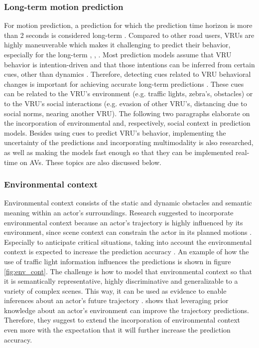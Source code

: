 \subsubsection{Long-term motion prediction}
For motion prediction, a prediction for which the prediction time horizon is more than 2 seconds is considered long-term \cite{hormann2020long}. Compared to other road users, \glspl{VRU} are highly maneuverable which makes it challenging to predict their behavior, especially for the long-term \cite{xiong2019recurrent}, \cite{rehder2018pedestrian}, \cite{rehder2018pedestrian}. Most prediction models assume that \gls{VRU} behavior is intention-driven and that those intentions can be inferred from certain cues, other than dynamics \cite{rehder2018pedestrian}. Therefore, detecting cues related to \gls{VRU} behavioral changes is important for achieving accurate long-term predictions \cite{pool2017using}. These cues can be related to the \gls{VRU}'s environment (e.g. traffic lights, zebra's, obstacles) or to the \gls{VRU}'s social interactions (e.g. evasion of other \gls{VRU}'s, distancing due to social norms, nearing another \gls{VRU}). The following two paragraphs elaborate on the incorporation of environmental and, respectively, social context in prediction models. Besides using cues to predict \gls{VRU}'s behavior, implementing the uncertainty of the predictions and incorporating multimodality is also researched, as well as making the models fast enough so that they can be implemented real-time on \glspl{AV}. These topics are also discussed below. 

\subsubsection{Environmental context}
Environmental context consists of the static and dynamic obstacles and semantic meaning within an actor's surroundings. Research suggested to incorporate environmental context because an actor's trajectory is highly influenced by its environment, since scene context can constrain the actor in its planned motions \cite{chou2020predicting} \cite{pfeiffer2018data} \cite{sadeghian2019sophie} \cite{manh2018scene}. Especially to anticipate critical situations, taking into account the environmental context is expected to increase the prediction accuracy \cite{uah2020d4}. An example of how the use of traffic light information influences the predictions is shown in figure \ref{fig:env_cont}. The challenge is how to model that environmental context so that it is semantically representative, highly discriminative and generalizable to a variety of complex scenes. This way, it can be used as evidence to enable inferences about an actor's future trajectory \cite{varshneya2017human}. \cite{pool2017using} shows that leveraging prior knowledge about an actor's environment can improve the trajectory predictions. Therefore, they suggest to extend the incorporation of environmental context even more with the expectation that it will further increase the prediction accuracy.  

